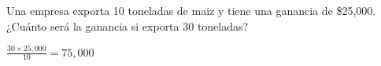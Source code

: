 
\question Una empresa exporta 10 toneladas de maiz y tiene una ganancia de
          \$25,000. ¿Cuánto será la ganancia si exporta 30 toneladas?

  \begin{solution}[2cm]
      $\frac{30 \times 25,000}{10} = 75,000$
  \end{solution}
